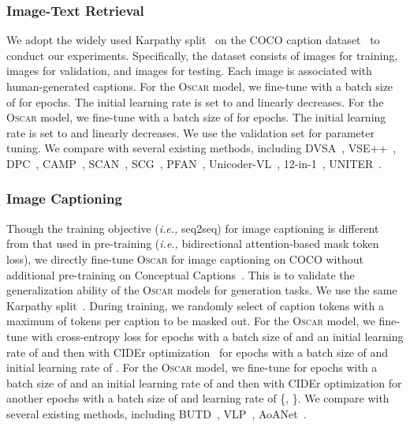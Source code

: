 \documentclass[runningheads]{llncs}
\newcommand{\ie}[0]{\emph{i.e., }}
\newcommand{\short}{\textsc{Oscar}}
\newcommand{\shortb}{\textsc{Oscar}}
\newcommand{\shortl}{\textsc{Oscar}}
\def\suppvspace{{\vspace{-3mm}}}
\begin{document}
\vspace{-2mm}
\subsubsection{Image-Text Retrieval}
We adopt the widely used Karpathy split~\cite{karpathy2015deep} on the COCO caption dataset~\cite{lin2014microsoft} to conduct our experiments. Specifically, the dataset consists of  images for training,  images for validation, and  images for testing. Each image is associated with  human-generated captions. For the \shortb{} model, we fine-tune with a batch size of  for  epochs. The initial learning rate is set to  and linearly decreases. For the \shortl{} model, we fine-tune with a batch size of  for  epochs. The initial learning rate is set to  and linearly decreases. We use the validation set for parameter tuning. 
We compare with several existing methods, including
DVSA~\cite{karpathy2015deep},
VSE++~\cite{faghri2017vse++}, 
DPC~\cite{zheng2017dual}, 
CAMP~\cite{wang2019camp}, 
SCAN~\cite{lee2018stacked}, 
SCG~\cite{shi2019knowledge}, 
PFAN~\cite{wang2019position}, 
Unicoder-VL~\cite{li2019unicoder},
12-in-1~\cite{lu201912},
UNITER~\cite{chen2019uniter}. 


\suppvspace
\subsubsection{Image Captioning}
Though the training objective (\ie seq2seq) for image captioning is different from that used in pre-training (\ie bidirectional attention-based mask token loss), we directly fine-tune \short{} for image captioning on COCO without additional pre-training on Conceptual Captions~\cite{sharma2018conceptual}. This is to validate the generalization ability of the \short{} models for generation tasks. We use the same Karpathy split~\cite{karpathy2015deep}. During training, we randomly select  of caption tokens with a maximum of  tokens per caption to be masked out. For the \shortb{} model, we fine-tune with cross-entropy loss for  epochs with a batch size of  and an initial learning rate of  and then with CIDEr optimization~\cite{rennie2017self} for  epochs with a batch size of  and initial learning rate of . For the \shortl{} model,  we fine-tune for  epochs with a batch size of  and an initial learning rate of  and then with CIDEr optimization for another  epochs with a batch size of  and learning rate of \{, \}. 
We compare with several existing methods, including
BUTD~\cite{anderson2018bottom},
VLP~\cite{zhou2019unified},
AoANet~\cite{huang2019attention}.
\end{document}
